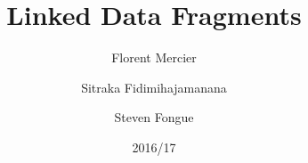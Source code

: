 \documentclass[a4paper, 12pt]{article}
\title{Linked Data Fragments}
\date{2016/17}
\author{Florent Mercier \and Sitraka Fidimihajamanana \and Steven Fongue}
\begin{document}
	
\maketitle{}

\tableofcontents
\end{document}
